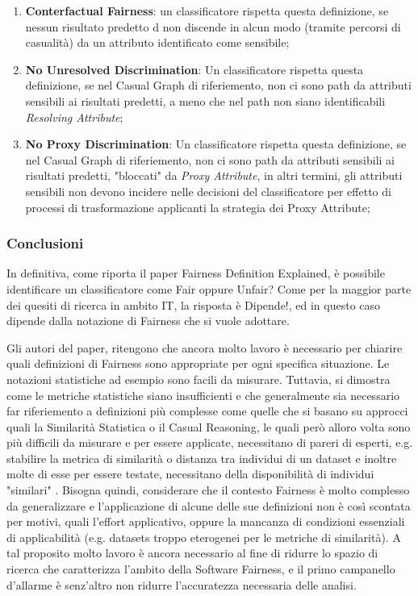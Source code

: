  \begin{enumerate}
     \item \textbf{Conterfactual Fairness}: un classificatore rispetta questa definizione, se nessun risultato predetto d non discende in alcun modo (tramite percorsi di casualità) da un attributo identificato come sensibile;
     \item \textbf{No Unresolved Discrimination}: Un classificatore rispetta questa definizione, se nel Casual Graph di riferiemento, non ci sono path da attributi sensibili ai risultati predetti, a meno che nel path non siano identificabili \textit{Resolving Attribute};
     \item \textbf{No Proxy Discrimination}: Un classificatore rispetta questa definizione, se nel Casual Graph di riferiemento, non ci sono path da attributi sensibili ai risultati predetti, "bloccati" da \textit{Proxy Attribute}, in altri termini, gli attributi sensibili non devono incidere nelle decisioni del classificatore per effetto di processi di trasformazione applicanti la strategia dei Proxy Attribute;
 \end{enumerate}
 
 \subsubsection{Conclusioni}
 In definitiva, come riporta il paper Fairness Definition Explained, è possibile identificare un classificatore come Fair oppure Unfair? Come per la maggior parte dei quesiti di ricerca in ambito IT, la risposta è Dipende!, ed in questo caso dipende dalla notazione di Fairness che si vuole adottare\cite{FairnessDefinitionExplained}.
 
Gli autori del paper, ritengono che ancora molto lavoro è necessario per chiarire quali definizioni di Fairness sono appropriate per ogni specifica situazione. Le notazioni statistiche ad esempio sono facili da misurare. Tuttavia, si dimostra come le metriche statistiche siano insufficienti e che generalmente sia necessario far riferiemento a definizioni più complesse come quelle che si basano su approcci quali la Similarità Statistica o il Casual Reasoning, le quali però alloro volta sono più difficili da misurare e per essere applicate, necessitano di pareri di esperti, e.g. stabilire la metrica di similarità o distanza tra individui di un dataset e inoltre molte di esse per essere testate, necessitano della disponibilità di individui "similari" \cite{FairnessDefinitionExplained}. Bisogna quindi, considerare che il contesto Fairness è molto complesso da generalizzare e l'applicazione di alcune delle sue definizioni non è così scontata per motivi, quali l'effort applicativo, oppure la mancanza di condizioni essenziali di applicabilità (e.g. datasets troppo eterogenei per le metriche di similarità). A tal proposito molto lavoro è ancora necessario al fine di ridurre lo spazio di ricerca che caratterizza l'ambito della Software Fairness, e il primo campanello d'allarme è senz'altro non ridurre l'accuratezza necessaria delle analisi\cite{FairnessDefinitionExplained}.\\\\


